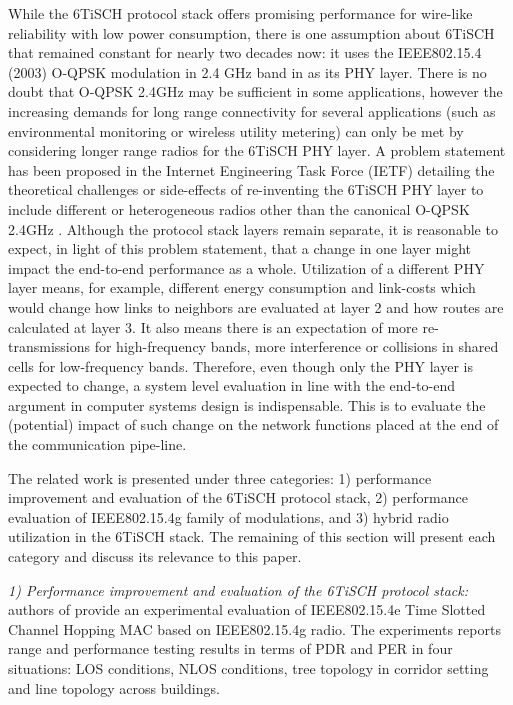 \documentclass[journal]{IEEEtran}
\newcommand{\oqpsk}        {O-QPSK 2.4GHz }
\begin{document}
While the 6TiSCH protocol stack offers promising performance for wire-like reliability with low power consumption, there is one assumption about 6TiSCH that remained constant for nearly two decades now: it uses the IEEE802.15.4 (2003) O-QPSK modulation in 2.4 GHz band in as its PHY layer. 
There is no doubt that \oqpsk may be sufficient in some applications, however the increasing demands for long range connectivity for several applications (such as environmental monitoring or wireless utility metering) can only be met by considering longer range radios for the 6TiSCH PHY layer.
A problem statement has been proposed in the Internet Engineering Task Force (IETF) detailing the theoretical challenges or side-effects of re-inventing the 6TiSCH PHY layer to include different or heterogeneous radios other than the canonical \oqpsk \cite{j.munoz18problem}. 
Although the protocol stack layers remain separate, it is reasonable to expect, in light of this problem statement, that a change in one layer might impact the end-to-end performance as a whole. 
Utilization of a different PHY layer means, for example, different energy consumption and link-costs which would change how links to neighbors are evaluated at layer 2 and how routes are calculated at layer 3.
It also means there is an expectation of more re-transmissions for high-frequency bands, more interference or collisions in shared cells for low-frequency bands.
Therefore, even though only the PHY layer is expected to change, a system level evaluation in line with the end-to-end argument in computer systems design \cite{saltzer84endtoend} is indispensable.
This is to evaluate the (potential) impact of such change on the network functions placed at the end of the communication pipe-line. 

The related work is presented under three categories: 
    1) performance improvement and evaluation of the 6TiSCH protocol stack,
    2) performance evaluation of IEEE802.15.4g family of modulations, and
    3) hybrid radio utilization in the 6TiSCH stack. 
The remaining of this section will present each category and discuss its relevance to this paper.

\textit{1) Performance improvement and evaluation of the 6TiSCH protocol stack:} authors of \cite{sum17experimental} provide an experimental evaluation of IEEE802.15.4e Time Slotted Channel Hopping MAC based on IEEE802.15.4g radio.
The experiments reports range and performance testing results in terms of PDR and PER in four situations: LOS conditions, NLOS conditions, tree topology in corridor setting and line topology across buildings.
\end{document}
